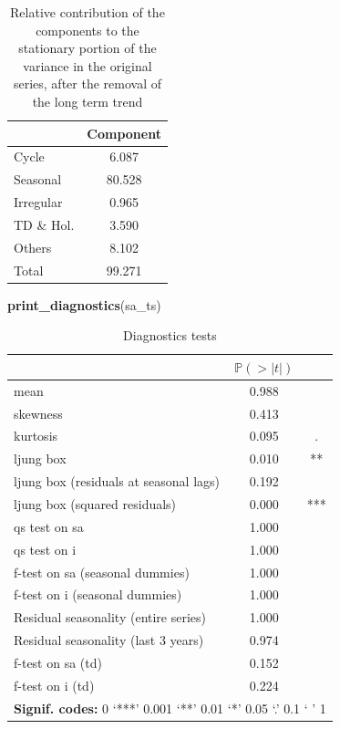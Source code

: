 \documentclass[
]{article}
\newenvironment{Shaded}{\begin{snugshade}}{\end{snugshade}}
\newcommand{\FunctionTok}[1]{\textcolor[rgb]{0.13,0.29,0.53}{\textbf{#1}}}
\newcommand{\NormalTok}[1]{#1}
\begin{document}
\begin{table}[H]
\centering
\caption{\label{tab:unnamed-chunk-4}Relative contribution of the components to the stationary portion of the variance in the original series, after the removal of the long term trend}
\centering
\begin{tabular}[t]{lc}
\toprule
  & Component\\
\midrule
Cycle & 6.087\\
Seasonal & 80.528\\
Irregular & 0.965\\
TD \& Hol. & 3.590\\
Others & 8.102\\
\addlinespace
Total & 99.271\\
\bottomrule
\end{tabular}
\end{table}

\begin{Shaded}
\begin{Highlighting}[]
\FunctionTok{print\_diagnostics}\NormalTok{(sa\_ts)}
\end{Highlighting}
\end{Shaded}

\begin{table}[H]
\centering
\caption{\label{tab:unnamed-chunk-4}Diagnostics tests}
\centering
\begin{tabular}[t]{l|c|c}
\hline
  & $\mathbb P (> \lvert t \rvert)$ & \\
\hline
mean & 0.988 & \\
\hline
skewness & 0.413 & \\
\hline
kurtosis & 0.095 & .\\
\hline
ljung box & 0.010 & **\\
\hline
ljung box (residuals at seasonal lags) & 0.192 & \\
\hline
ljung box (squared residuals) & 0.000 & ***\\
\hline
qs test on sa & 1.000 & \\
\hline
qs test on i & 1.000 & \\
\hline
f-test on sa (seasonal dummies) & 1.000 & \\
\hline
f-test on i (seasonal dummies) & 1.000 & \\
\hline
Residual seasonality (entire series) & 1.000 & \\
\hline
Residual seasonality (last 3 years) & 0.974 & \\
\hline
f-test on sa (td) & 0.152 & \\
\hline
f-test on i (td) & 0.224 & \\
\hline
\multicolumn{3}{l}{\rule{0pt}{1em}\textbf{Signif. codes: }0 `***' 0.001 `**' 0.01 `*' 0.05 `.' 0.1 ` ' 1}\\
\end{tabular}
\end{table}
\end{document}
